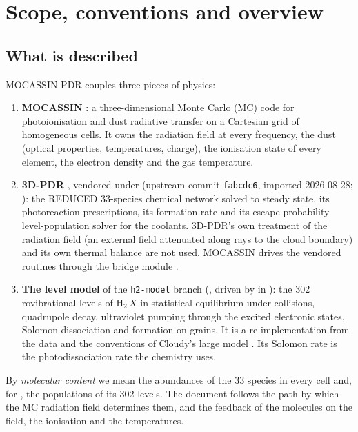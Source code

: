 \section{Scope, conventions and overview}
\label{sec:scope}

\subsection{What is described}

MOCASSIN-PDR couples three pieces of physics:
\begin{enumerate}
\item \textbf{MOCASSIN} \citep{Ercolano2003,Ercolano2005,Ercolano2008}: a
  three-dimensional Monte Carlo (MC) code for photoionisation and dust
  radiative transfer on a Cartesian grid of homogeneous cells. It owns the
  radiation field at every frequency, the dust (optical properties,
  temperatures, charge), the ionisation state of every element, the electron
  density and the gas temperature.
\item \textbf{3D-PDR} \citep{Bisbas2012}, vendored under
   (upstream commit \texttt{fabcdc6}, imported 2026-08-28;
  ): the REDUCED 33-species chemical network solved
  to steady state, its photoreaction prescriptions, its \Htwo{} formation rate
  and its escape-probability level-population solver for the coolants. 3D-PDR's
  own treatment of the radiation field (an external field attenuated along
  rays to the cloud boundary) and its own thermal balance are not used.
  MOCASSIN drives the vendored routines through the bridge module
  .
\item \textbf{The \Htwo{} level model} of the \texttt{h2-model} branch
  (, driven by  in
  ): the 302 rovibrational levels of $\mathrm{H_2}\,X$ in
  statistical equilibrium under collisions, quadrupole decay, ultraviolet
  pumping through the excited electronic states, Solomon dissociation and
  formation on grains. It is a re-implementation from the data and the
  conventions of Cloudy's large \Htwo{} model \citep{Shaw2005,Ferland2017,Chatzikos2023}.
  Its Solomon rate is the \Htwo{} photodissociation rate the chemistry uses.
\end{enumerate}
By \emph{molecular content} we mean the abundances of the 33 species in every
cell and, for \Htwo, the populations of its 302 levels. The document follows
the path by which the MC radiation field determines them, and the feedback of
the molecules on the field, the ionisation and the temperatures.

